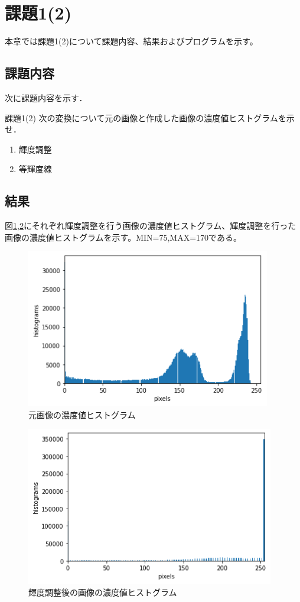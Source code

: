 \documentclass[11pt,a4paper,titlepage,dvipdfmx]{jarticle}
\begin{document}
  \section{課題1(2)}
    本章では課題1(2)について課題内容、結果およびプログラムを示す。
    \subsection{課題内容}
      次に課題内容を示す．
      \begin{itembox}[l]{課題1(2)}
        次の変換について元の画像と作成した画像の濃度値ヒストグラムを示せ．
        \begin{enumerate}
          \item 輝度調整
          \item 等輝度線
        \end{enumerate}
      \end{itembox}
    \subsection{結果}
      図\ref{fig:building-hist},\ref{fig:after-building-hist}にそれぞれ輝度調整を行う画像の濃度値ヒストグラム、輝度調整を行った画像の濃度値ヒストグラムを示す。MIN=75,MAX=170である。
      \begin{figure}[H]
        \centering
        \includegraphics[scale=.8]{./building-hist.png}
        \caption{元画像の濃度値ヒストグラム}
        \label{fig:building-hist}
      \end{figure} 
      \begin{figure}[H]
        \centering
        \includegraphics[scale=.8]{./after-building-hist.png}
        \caption{輝度調整後の画像の濃度値ヒストグラム}
        \label{fig:after-building-hist}
      \end{figure} 
\end{document}
